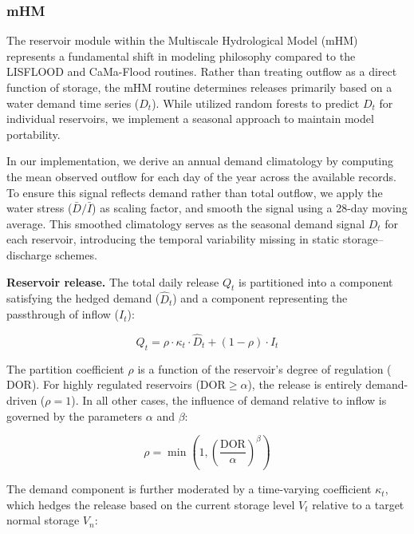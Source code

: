 \documentclass[hess, manuscript]{copernicus}
\begin{document}
\subsubsection{mHM}
\label{sec:mhm}

The reservoir module within the Multiscale Hydrological Model (mHM) \citep{Samaniego2010, Kumar2013, Thober2019} represents a fundamental shift in modeling philosophy compared to the LISFLOOD and CaMa-Flood routines. Rather than treating outflow as a direct function of storage, the mHM routine determines releases primarily based on a water demand time series ($D_t$). While \citet{Shrestha2024} utilized random forests to predict $D_t$ for individual reservoirs, we implement a seasonal approach to maintain model portability.

In our implementation, we derive an annual demand climatology by computing the mean observed outflow for each day of the year across the available records. To ensure this signal reflects demand rather than total outflow, we apply the water stress ($\bar{D} / \bar{I}$) as scaling factor, and smooth the signal using a 28-day moving average. This smoothed climatology serves as the seasonal demand signal $D_t$ for each reservoir, introducing the temporal variability missing in static storage–discharge schemes.

\medskip
\textbf{Reservoir release.} The total daily release $Q_t$ is partitioned into a component satisfying the hedged demand ($\hat{D}_t$) and a component representing the passthrough of inflow ($I_t$):

\begin{equation}
\label{eq:mhm}
    Q_t = \rho \cdot \kappa_t \cdot \hat{D}_t + (1 - \rho) \cdot I_t
\end{equation}

The partition coefficient $\rho$ is a function of the reservoir's degree of regulation ($\text{DOR}$). For highly regulated reservoirs ($\text{DOR} \geq \alpha$), the release is entirely demand-driven ($\rho = 1$). In all other cases, the influence of demand relative to inflow is governed by the parameters $\alpha$ and $\beta$:

\begin{equation}
\label{eq:partition_coeff}
    \rho = \min\left(1, \left( \frac{\text{DOR}}{\alpha} \right)^\beta \right)
\end{equation}

The demand component is further moderated by a time-varying coefficient $\kappa_t$, which hedges the release based on the current storage level $V_t$ relative to a target normal storage $V_n$:
\end{document}
